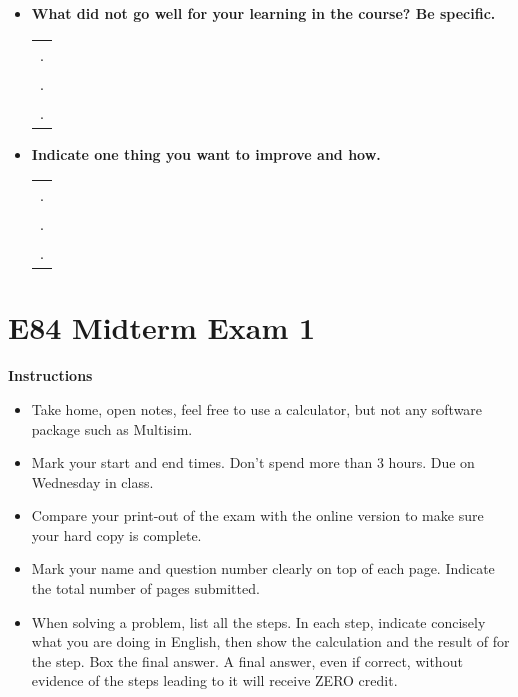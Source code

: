 \begin{itemize}
\begin{itemize}
\item {\bf What did not go well for your learning in the course? Be specific.}
\begin{tabular}{l}
.  \\
.  \\
.  \\
\end{tabular}
\vskip 0.9in

\item {\bf Indicate one thing you want to improve and how.}
\begin{tabular}{l}
.  \\
.  \\
.  \\
\end{tabular}
\vskip 0.9in

\end{itemize}

\end{itemize}


\section*{E84 Midterm Exam 1}

{\bf Instructions}
\begin{itemize}
\item Take home, open notes, feel free to use a calculator, but not any software package 
  such as Multisim. 
\item Mark your start and end times. Don't spend more than 3 hours. Due on Wednesday in class.
\item Compare your print-out of the exam with the online version to make
  sure your hard copy is complete.
\item Mark your name and question number clearly on top of each page.
  Indicate the total number of pages submitted.
\item When solving a problem, list all the steps. In each step, indicate
  concisely what you are doing in English, then show the calculation 
  and the result of for the step. Box the final answer.
  A final answer, even if correct, without evidence of the steps leading
  to it will receive ZERO credit.
\end{itemize}

